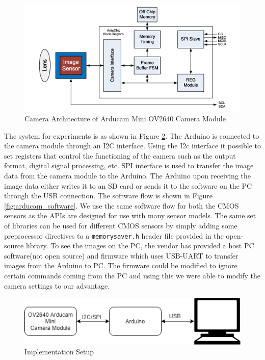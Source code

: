 \begin{figure}[!htbp]
\centering
\includegraphics[scale=0.75]{pics/arducam_architecture}
\caption{Camera Architecture of Arducam Mini OV2640 Camera Module}
\label{fig:arducam_arch}
\end{figure}

The system for experiments is as shown in Figure \ref{fig:imp_setup}. The Arduino is connected to the camera module through an I2C interface. Using the I2c interface it possible to set registers that control the functioning of the camera such as the output format, digital signal processing, etc. SPI interface is used to transfer the image data from the camera module to the Arduino. The Arduino upon receiving the image data either writes it to an  SD card or sends it to the software on the PC through the USB connection. The software flow is shown in Figure \ref{fig:arducam_software}. We use the same software flow for both the CMOS sensors as the APIs are designed for use with many sensor models. The same set of libraries can be used for different CMOS sensors by simply adding some preprocessor directives to a \texttt{memorysaver.h} header file provided in the open-source library. To see the images on the PC, the vendor has provided a host PC software(not open source) and firmware which uses USB-UART to transfer images from the Arduino to PC. The firmware could be modified to ignore certain commands coming from the PC and using this we were able to modify the camera settings to our advantage. 
\begin{figure}[!htbp]
\centering
\includegraphics[scale=0.75]{pics/implementation_setup}
\caption{Implementation Setup}
\label{fig:imp_setup}
\end{figure}

